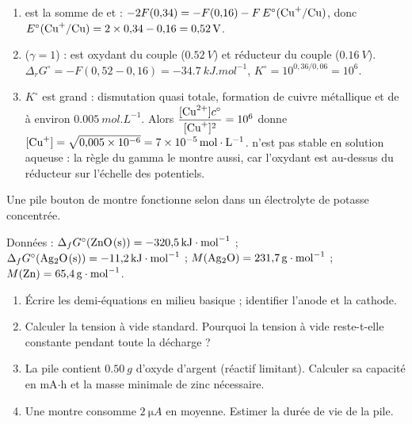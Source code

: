 \correction
\begin{enumerate}
  \item {} est la somme de  et  : $-2F(0{,}34) = -F(0{,}16) - F\,E^\circ(\ce{Cu+/Cu})$, donc $E^\circ(\ce{Cu+/Cu}) = 2\times0{,}34 - 0{,}16 = \SI{0,52}{V}$.
  \item {} ($\gamma = 1$) :  est oxydant du couple  ($\SI{0,52}{V}$) et réducteur du couple  ($\SI{0,16}{V}$). $\Delta_rG^\circ = -F(0{,}52 - 0{,}16) = \SI{-34,7}{kJ.mol^{-1}}$, $K^\circ = 10^{0{,}36/0{,}06} = 10^6$.
  \item $K^\circ$ est grand : dismutation quasi totale, formation de cuivre métallique et de  à environ $\SI{0,005}{mol.L^{-1}}$. Alors $\dfrac{[\ce{Cu^{2+}}]c^\circ}{[\ce{Cu+}]^2} = 10^6$ donne $[\ce{Cu+}] = \sqrt{0{,}005\times10^{-6}} = \SI{7e-5}{mol.L^{-1}}$.  n'est pas stable en solution aqueuse : la règle du gamma le montre aussi, car l'oxydant  est au-dessus du réducteur  sur l'échelle des potentiels.
\end{enumerate}

\label{exo:bouton}
Une pile bouton de montre fonctionne selon  dans un électrolyte de potasse concentrée.

\noindent Données : $\Delta_fG^\circ(\ce{ZnO(s)}) = \SI{-320,5}{kJ.mol^{-1}}$ ; $\Delta_fG^\circ(\ce{Ag2O(s)}) = \SI{-11,2}{kJ.mol^{-1}}$ ; $M(\ce{Ag2O}) = \SI{231,7}{g.mol^{-1}}$ ; $M(\ce{Zn}) = \SI{65,4}{g.mol^{-1}}$.
\begin{enumerate}
  \item Écrire les demi-équations en milieu basique ; identifier l'anode et la cathode.
  \item Calculer la tension à vide standard. Pourquoi la tension à vide reste-t-elle constante pendant toute la décharge ?
  \item La pile contient $\SI{0,50}{g}$ d'oxyde d'argent (réactif limitant). Calculer sa capacité en mA$\cdot$h et la masse minimale de zinc nécessaire.
  \item Une montre consomme $\SI{2}{\micro A}$ en moyenne. Estimer la durée de vie de la pile.
\end{enumerate}

